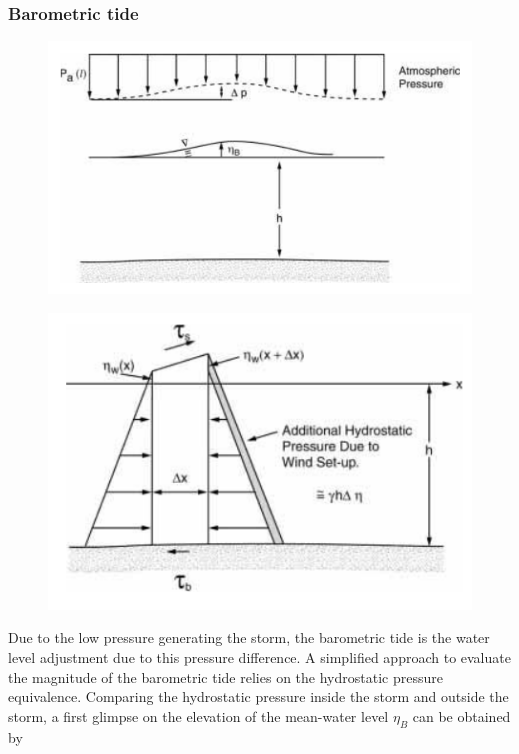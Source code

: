 \subsubsection*{Barometric tide}
\begin{figure}[t]
\centering
\begin{minipage}{.45\textwidth}
 \flushleft
  \includegraphics[scale=0.35]{./SurfWaves_figs/Barometric.png}
  \label{fig:test1}
\end{minipage}%
\begin{minipage}{.45\textwidth}
  \centering
  \includegraphics[scale=0.35]{./SurfWaves_figs/wind_setup.png}
  \label{fig:test2}
\end{minipage}
\end{figure}
Due to the low pressure generating the storm, the barometric tide is the water level adjustment due to this pressure difference. A simplified approach to evaluate the magnitude of the barometric tide relies on the hydrostatic pressure equivalence. Comparing the hydrostatic pressure inside the storm and outside the storm, a first glimpse on the elevation of the mean-water level $\eta_{B}$ can be obtained by
